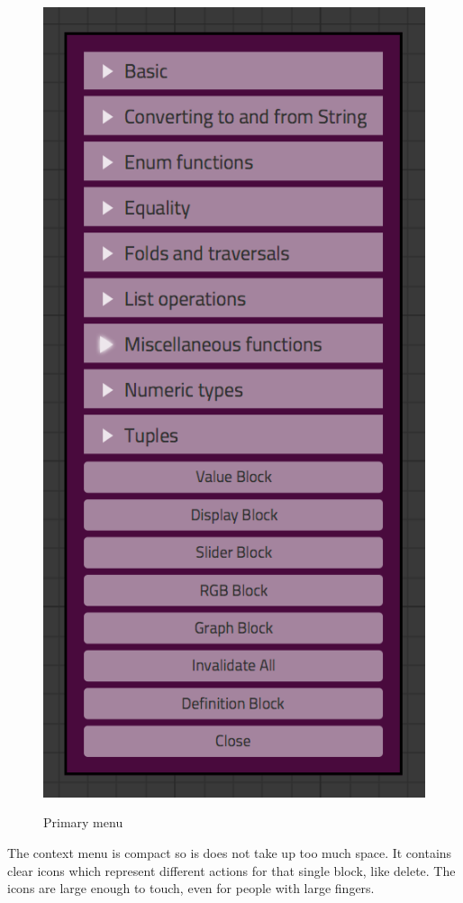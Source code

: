 \begin{figure}[p]
	\centering
	\includegraphics[scale=0.5]{Images/menu}
	\label{fig:ui-menu}
	\caption{Primary menu}
\end{figure}

The context menu is compact so is does not take up too much space.
It contains clear icons which represent different actions for that single block, like delete.
The icons are large enough to touch, even for people with large fingers.

